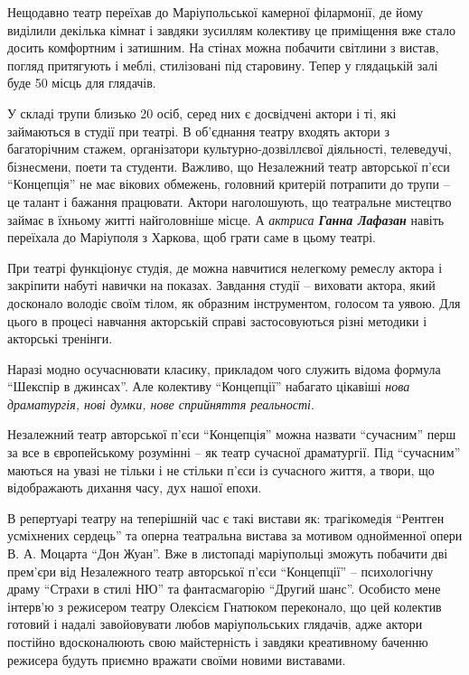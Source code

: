 Нещодавно театр переїхав до Маріупольської камерної філармонії, де йому
виділили декілька кімнат і завдяки зусиллям колективу це приміщення вже стало
досить комфортним і затишним. На стінах можна побачити світлини з вистав,
погляд притягують і меблі, стилізовані під старовину. Тепер у глядацькій залі
буде 50 місць для глядачів.

У складі трупи близько 20 осіб, серед них є досвідчені актори і ті, які
займаються в студії при театрі. В об'єднання театру входять актори з
багаторічним стажем, організатори культурно-дозвіллєвої діяльності, телеведучі,
бізнесмени, поети та студенти. Важливо, що Незалежний театр авторської п'єси
\enquote{Концепція} не має вікових обмежень, головний критерій потрапити до
трупи – це талант і бажання працювати. Актори наголошують, що театральне
мистецтво займає в їхньому житті найголовніше місце. А \emph{актриса \textbf{Ганна Лафазан}}
навіть переїхала до Маріуполя з Харкова, щоб грати саме в цьому театрі.


При театрі функціонує студія, де можна навчитися нелегкому ремеслу актора і
закріпити набуті навички на показах. Завдання студії – виховати актора, який
досконало володіє своїм тілом, як образним інструментом, голосом та уявою. Для
цього в процесі навчання акторській справі застосовуються різні методики і
акторські тренінги.

Наразі модно осучаснювати класику, прикладом чого служить відома формула
\enquote{Шекспір в джинсах}. Але колективу \enquote{Концепції} набагато цікавіші \emph{нова
драматургія, нові думки, нове сприйняття реальності}.

Незалежний театр авторської п'єси \enquote{Концепція} можна назвати \enquote{сучасним} перш за
все в європейському розумінні – як театр сучасної драматургії. Під \enquote{сучасним}
маються на увазі не тільки і не стільки п'єси із сучасного життя, а твори, що
відображають дихання часу, дух нашої епохи.


В репертуарі театру на теперішній час є такі вистави як: трагікомедія \enquote{Рентген
усміхнених сердець} та оперна театральна вистава за мотивом однойменної опери
В. А. Моцарта \enquote{Дон Жуан}. Вже в листопаді маріупольці зможуть побачити дві
прем'єри від Незалежного театр авторської п'єси \enquote{Концепції} – психологічну
драму \enquote{Страхи в стилі НЮ} та фантасмагорію \enquote{Другий шанс}. Особисто мене
інтерв'ю з режисером театру Олексієм Гнатюком переконало, що цей колектив
готовий і надалі завойовувати любов маріупольських глядачів, адже актори
постійно вдосконалюють свою майстерність і завдяки креативному баченню
режисера будуть приємно вражати своїми новими виставами.

